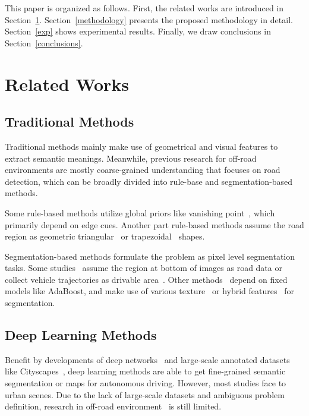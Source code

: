 \documentclass[letterpaper, 10 pt, conference]{ieeeconf}  %
\begin{document}
This paper is organized as follows. First, the related works
are introduced in Section~\ref{related_works}. Section~\ref{methodology} presents the proposed methodology in detail. Section~\ref{exp} shows experimental results. Finally, we draw conclusions in Section~\ref{conclusions}.

\section{Related Works} \label{related_works}
\subsection{Traditional Methods}
Traditional methods mainly make use of geometrical and visual features to extract semantic meanings. Meanwhile, previous research for off-road environments are mostly coarse-grained understanding that focuses on road detection, which can be broadly divided into rule-base and segmentation-based methods.

Some rule-based methods utilize global priors like vanishing point~\cite{kong2009vanishing}\cite{shi2015fast}, which primarily depend on edge cues. Another part rule-based methods assume the road region as geometric triangular~\cite{zhou2010self} or trapezoidal~\cite{jeong2002vision} shapes.

Segmentation-based methods formulate the problem as pixel level segmentation tasks. Some studies~\cite{lu2014hierarchical}
assume the region at bottom of images as road data or collect vehicle trajectories as drivable area~\cite{mei2017scene}.
Other methods~\cite{alon2006off}\cite{wang2009unstructured} depend on fixed models like AdaBoost, and make use of various texture~\cite{alon2006off} or hybrid features~\cite{wang2009unstructured} for segmentation.

\subsection{Deep Learning Methods}
Benefit by developments of deep networks~\cite{long2015fully} and large-scale annotated datasets like Cityscapes~\cite{cordts2016cityscapes}, deep learning methods are able to get fine-grained semantic segmentation or maps for autonomous driving. However, most studies face to urban scenes. Due to the lack of large-scale datasets and ambiguous problem definition, research in off-road environment~\cite{maturana2018real} is still limited.
\end{document}
